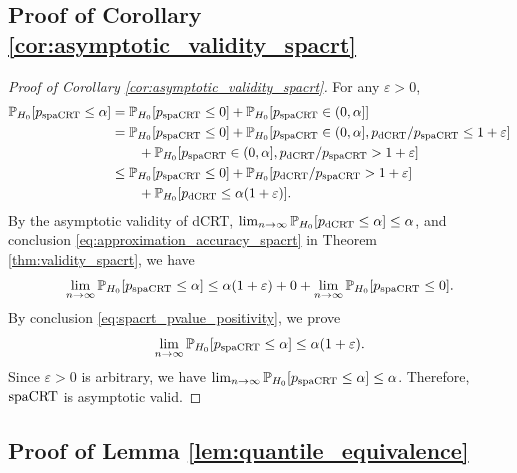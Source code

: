 \documentclass[12pt]{article}
\theoremstyle{definition}
\def\P{\mathbb{P}}
\def\P{\mathbb{P}}
\renewcommand{\P}{\mathbb{P}}							%
\newcommand{\dCRT}{\textnormal{dCRT}} 					%
\newcommand{\spacrt}{\textnormal{spaCRT}}               %
\begin{document}
  \subsection{Proof of Corollary \ref{cor:asymptotic_validity_spacrt}}

  \begin{proof}[Proof of Corollary \ref{cor:asymptotic_validity_spacrt}]
    
    For any $\varepsilon>0$,
    \begin{align*}
      \P_{H_0}[p_{\spacrt}\leq \alpha]
      &
      =\P_{H_0}[p_{\spacrt}\leq 0]+\P_{H_0}[p_{\spacrt}\in (0,\alpha]]\\
      &
      =\P_{H_0}[p_{\spacrt}\leq 0]+\P_{H_0}[p_{\spacrt}\in (0,\alpha],p_{\dCRT}/p_{\spacrt}\leq 1+\varepsilon]\\
      &
      \qquad+\P_{H_0}[p_{\spacrt}\in (0,\alpha],p_{\dCRT}/p_{\spacrt}> 1+\varepsilon]\\
      &
      \leq \P_{H_0}[p_{\spacrt}\leq 0]+\P_{H_0}[p_{\dCRT}/p_{\spacrt}> 1+\varepsilon]\\
      &
      \qquad+\P_{H_0}[p_{\dCRT}\leq\alpha(1+\varepsilon)].
    \end{align*}
    By the asymptotic validity of dCRT, $\lim_{n\rightarrow\infty}\P_{H_0}[p_{\dCRT}\leq\alpha]\leq\alpha$, and conclusion \eqref{eq:approximation_accuracy_spacrt} in Theorem \ref{thm:validity_spacrt}, we have 
    \begin{align*}
      \lim_{n\rightarrow\infty}\P_{H_0}[p_{\spacrt}\leq\alpha]\leq \alpha(1+\varepsilon) + 0 + \lim_{n\rightarrow\infty}\P_{H_0}[p_{\spacrt}\leq 0].
    \end{align*}
    By conclusion \eqref{eq:spacrt_pvalue_positivity}, we prove 
    \begin{align*}
      \lim_{n\rightarrow\infty}\P_{H_0}[p_{\spacrt}\leq\alpha]\leq \alpha(1+\varepsilon).
    \end{align*}
    Since $\varepsilon>0$ is arbitrary, we have $\lim_{n\rightarrow\infty}\P_{H_0}[p_{\spacrt}\leq \alpha]\leq \alpha$. Therefore, $\spacrt$ is asymptotic valid.

  \end{proof}


  \subsection{Proof of Lemma \ref{lem:quantile_equivalence}}
  
\end{document}
